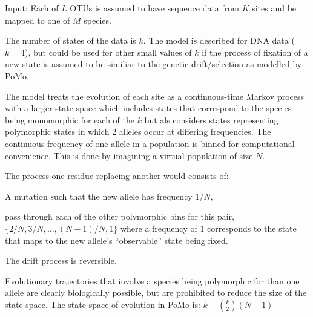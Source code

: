 \documentclass{llncs}
\newcommand{\numOTUs}{\ensuremath{L}}
\newcommand{\numSites}{\ensuremath{K}}
\newcommand{\numSp}{\ensuremath{M}}
\newcommand{\numObsStates}{\ensuremath{k}}
\newcommand{\virtPopSize}{\ensuremath{N}}
\newcommand{\pomo}{PoMo\xspace}
\begin{document}
Input: Each of $\numOTUs$ OTUs is assumed to have sequence data from $\numSites$ sites and be mapped to one of $\numSp$ species.

The number of states of the data is $\numObsStates$. 
The model is described for DNA data ($\numObsStates=4$), but could be used for other small values of $\numObsStates$ if
    the process of fixation of a new state is assumed to be similiar to the genetic drift/selection as modelled by \pomo.

The model treats the evolution of each site as a continuous-time Markov process with a larger state space which
    includes states that correspond to the species being monomorphic for each of the $\numObsStates$ but als
    considers states representing polymorphic states in which 2 alleles occur at differing frequencies.
The continuous frequency of one allele in a population is binned for computational convenience.
This is done by imagining a virtual population of size $\virtPopSize$.

The process one residue replacing another would consists of:
\begin{compactenum}
\item A mutation such that the new allele has frequency $1/\virtPopSize$,
\item pass through each of the other polymorphic bins for this pair, $\{2/\virtPopSize, 3/\virtPopSize,\ldots,(\virtPopSize-1)/\virtPopSize, 1\}$
    where a frequency of 1 corresponds to the state that maps to the new allele's ``observable'' state being fixed.
\end{compactenum}
The drift process is reversible.

Evolutionary trajectories that involve a species being polymorphic for than one allele are clearly 
    biologically possible, but are prohibited to reduce the size of the state space.
    The state space of evolution in \pomo is: $\numObsStates + {\numObsStates \choose 2} \left(\virtPopSize - 1\right)$
\end{document}
